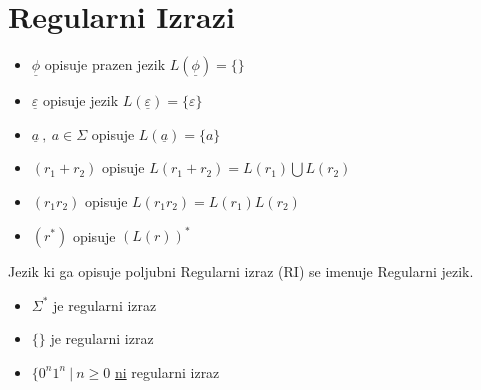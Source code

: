 \documentclass[10pt,a4paper]{article}
\begin{document}
\section{Regularni Izrazi}
	\begin{itemize}
		\item $ \underline{\phi} $ opisuje prazen jezik $ L(\underline{\phi})= \lbrace \rbrace $
		\item $ \underline{ \varepsilon } $ opisuje jezik $ L(\underline{ \varepsilon })= \lbrace \varepsilon\rbrace $
		\item $ \underline{a} \ , \ a \in \Sigma $ opisuje $ L ( \underline{a} ) = \lbrace a \rbrace $
		\item $ (r_1 + r_2) $ opisuje $ L(r_1 + r_2) = L(r_1) \bigcup L( r_2) $
		\item $ (r_1  r_2) $ opisuje $ L(r_1  r_2) = L(r_1) L( r_2) $
		\item $ (r^*) $ opisuje $ (L(r))^* $
	\end{itemize}
	Jezik ki ga opisuje poljubni Regularni izraz (RI) se imenuje Regularni jezik.
	\begin{itemize}
		\item $\Sigma^* $ je regularni izraz
		\item $ \lbrace \rbrace $ je regularni izraz
		\item $ \lbrace 0^n 1^n \ | \ n \geqslant 0 $ \underline{ni} regularni izraz
	\end{itemize}
	
\end{document}
